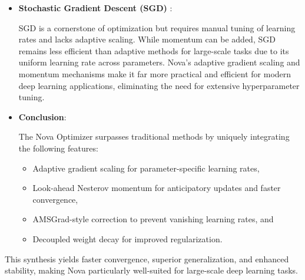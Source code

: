 \documentclass{article}
\begin{document}
\begin{itemize}
 RMSProp adapts learning rates based on a moving average of squared gradients but lacks momentum and AMSGrad’s stabilization mechanisms. Consequently, it struggles with convergence speed and stability, especially in deep networks, as reflected in its update rule:


\[
\theta_{t+1} = \theta_t - \eta \frac{g_t}{\sqrt{v_t} + \epsilon},
\]


where $g_t$ is the gradient at step $t$. Nova’s integration of Nesterov momentum and AMSGrad ensures faster and more stable convergence by leveraging both adaptive scaling and anticipatory updates.

\item \textbf{Stochastic Gradient Descent (SGD)} \cite{Robbins1951}: 

SGD is a cornerstone of optimization but requires manual tuning of learning rates and lacks adaptive scaling. While momentum can be added, SGD remains less efficient than adaptive methods for large-scale tasks due to its uniform learning rate across parameters. Nova’s adaptive gradient scaling and momentum mechanisms make it far more practical and efficient for modern deep learning applications, eliminating the need for extensive hyperparameter tuning.

\item {\bf Conclusion}:

The Nova Optimizer surpasses traditional methods by uniquely integrating the following features:

\begin{itemize}
    \item Adaptive gradient scaling for parameter-specific learning rates,
    \item Look-ahead Nesterov momentum for anticipatory updates and faster convergence,
    \item AMSGrad-style correction to prevent vanishing learning rates, and
    \item Decoupled weight decay for improved regularization.
\end{itemize}


\end{itemize}


This synthesis yields faster convergence, superior generalization, and enhanced stability, making Nova particularly well-suited for large-scale deep learning tasks.


\end{document}

